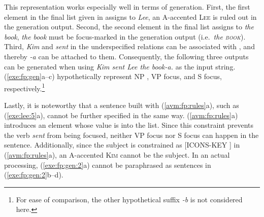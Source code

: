 


\largerpage[-1]
This representation works especially well in terms of generation.
First, the first element in the final  list given in
 assigns  to \textit{Lee}, an
A-accented \textsc{Lee} is ruled out in the generation output.
Second, the second element in the final  list assigns
 to \textit{the book}, \textit{the book} must be
focus-marked in the generation output (i.e.\ \textit{the
  \textsc{book}}). Third, \textit{Kim} and \textit{sent} in the
underspecified relations can be associated with ,
and thereby \textit{-a} can be attached to them.  Consequently, the following
three outputs can be generated when using \textit{Kim sent Lee the
  book-a.}  as the input string.  (\ref{exe:fp:gen}a--c) hypothetically
represent NP , VP focus, and S focus, respectively.\footnote{For
  ease of comparison, the other hypothetical suffix \textit{-b} is not
  considered here.}



Lastly, it is noteworthy that a sentence built with
(\ref{avm:fp:rules}a), such as (\ref{exe:lee:5}a), cannot be further
specified in the same way.  (\ref{avm:fp:rules}a) introduces an
element whose value is  into the 
list. Since this constraint prevents the verb \textit{sent} from being
focused, neither VP focus nor S focus can happen in the
sentence. Additionally, since the subject is constrained as [ICONS-KEY
  ] in (\ref{avm:fp:rules}a), an
A-accented \textsc{Kim} cannot be the subject.  In an actual
processing, (\ref{exe:fp:gen:2}a) cannot be paraphrased as sentences
in (\ref{exe:fp:gen:2}b--d).

